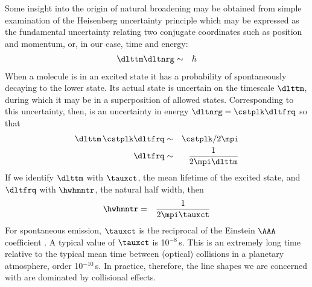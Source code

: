 \documentclass[12pt]{article}
\begin{document}
Some insight into the origin of natural broadening may be obtained
from simple examination of the Heisenberg uncertainty principle
which may be expressed as the fundamental uncertainty relating two
conjugate coordinates such as position and momentum, or, in our case,
time and energy:
\begin{eqnarray}
\dlttm \dltnrg  & \sim & \hbar 
\label{eqn:hsn_unc_prn}
\end{eqnarray}
When a molecule is in an excited state it has a probability of
spontaneously decaying to the lower state. 
Its actual state is uncertain on the timescale $\dlttm$, during which 
it may be in a superposition of allowed states.
Corresponding to this uncertainty, then, is an uncertainty in energy
$\dltnrg = \cstplk \dltfrq$ so that
\begin{eqnarray}
\dlttm \, \cstplk \dltfrq  & \sim & \cstplk/2\mpi \nonumber \\
\dltfrq  & \sim & \frac{1}{2\mpi \dlttm}
\label{eqn:hsn_unc_prn_2}
\end{eqnarray}
If we identify $\dlttm$ with $\tauxct$, the mean lifetime of the
excited state, and $\dltfrq$ with $\hwhmntr$, the natural half width,
then 
\begin{eqnarray}
\hwhmntr & = & \frac{1}{2 \mpi \tauxct}
\label{eqn:hwhm_ntr_dfn}
\end{eqnarray}
For spontaneous emission, $\tauxct$ is the reciprocal of the Einstein
$\AAA$ coefficient \cite[]{Shu91}.
A typical value of $\tauxct$ is 10$^{-8}$\,s.
This is an extremely long time relative to the typical mean time
between (optical) collisions in a planetary atmosphere, order
10$^{-10}$\,s.  
In practice, therefore, the line shapes we are concerned with are
dominated by collisional effects.
\end{document}
